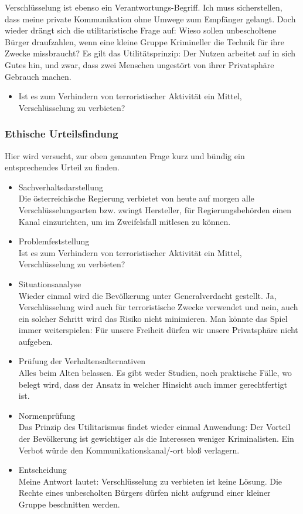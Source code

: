\documentclass[letterpaper, 12pt]{article}
\let\tempsubsubsection\subsubsection
\renewcommand\subsubsection[1]{\vspace{0cm}\tempsubsubsection{#1}\vspace{0cm}}
\begin{document}
Verschlüsselung ist ebenso ein Verantwortungs-Begriff. Ich muss sicherstellen, dass meine private Kommunikation ohne Umwege zum Empfänger gelangt. Doch wieder drängt sich die utilitaristische Frage auf: Wieso sollen unbescholtene Bürger draufzahlen, wenn eine kleine Gruppe Krimineller die Technik für ihre Zwecke missbraucht? Es gilt das Utilitätsprinzip: Der Nutzen arbeitet auf in sich Gutes hin, und zwar, dass zwei Menschen ungestört von ihrer Privatsphäre Gebrauch machen.

\begin{itemize}
	\item Ist es zum Verhindern von terroristischer Aktivität ein Mittel, Verschlüsselung zu verbieten?
\end{itemize}

\subsubsection{Ethische Urteilsfindung}

Hier wird versucht, zur oben genannten Frage kurz und bündig ein entsprechendes Urteil zu finden.

\begin{itemize}
	\item Sachverhaltsdarstellung \\
	Die österreichische Regierung verbietet von heute auf morgen alle Verschlüsselungsarten bzw. zwingt Hersteller, für Regierungsbehörden einen Kanal einzurichten, um im Zweifelsfall mitlesen zu können. 
	\item Problemfeststellung \\
	Ist es zum Verhindern von terroristischer Aktivität ein Mittel, Verschlüsselung zu verbieten?
	\item Situationsanalyse \\
	Wieder einmal wird die Bevölkerung unter Generalverdacht gestellt. Ja, Verschlüsselung wird auch für terroristische Zwecke verwendet und nein, auch ein solcher Schritt wird das Risiko nicht minimieren. Man könnte das Spiel immer weiterspielen: Für unsere Freiheit dürfen wir unsere Privatsphäre nicht aufgeben.
	\item Prüfung der Verhaltensalternativen \\
	Alles beim Alten belassen. Es gibt weder Studien, noch praktische Fälle, wo belegt wird, dass der Ansatz in welcher Hinsicht auch immer gerechtfertigt ist.
	\item Normenprüfung \\
	Das Prinzip des Utilitarismus findet wieder einmal Anwendung: Der Vorteil der Bevölkerung ist gewichtiger als die Interessen weniger Kriminalisten. Ein Verbot würde den Kommunikationskanal/-ort bloß verlagern.
	\item Entscheidung \\
	Meine Antwort lautet: Verschlüsselung zu verbieten ist keine Lösung. Die Rechte eines unbescholten Bürgers dürfen nicht aufgrund einer kleiner Gruppe beschnitten werden.
\end{itemize}
\end{document}
